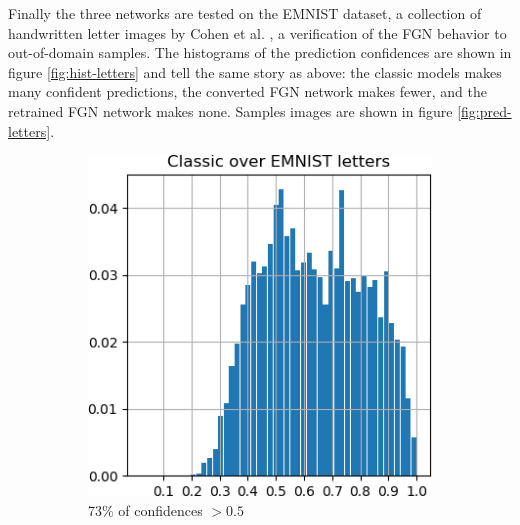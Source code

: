 \documentclass[12pt,oneside]{CUNY_PhD}
\begin{document}
\indent Finally the three networks are tested on the EMNIST dataset, a collection of handwritten letter images by Cohen et al. \cite{cohen2017emnist}, a verification of the FGN behavior to out-of-domain samples. The histograms of the prediction confidences are shown in figure \ref{fig:hist-letters} and tell the same story as above: the classic models makes many confident predictions, the converted FGN network makes fewer, and the retrained FGN network makes none. Samples images are shown in figure \ref{fig:pred-letters}.
\begin{figure}[!htbp]
    \centering
    \begin{subfigure}[t]{0.32\textwidth}
        \includegraphics[width=\textwidth]{images/Letters/hist-classic-letters.png}
        \caption*{73\%  of confidences $>0.5$}
    \end{subfigure}
    \begin{subfigure}[t]{0.32\textwidth}

\end{subfigure}
\end{figure}
\end{document}
